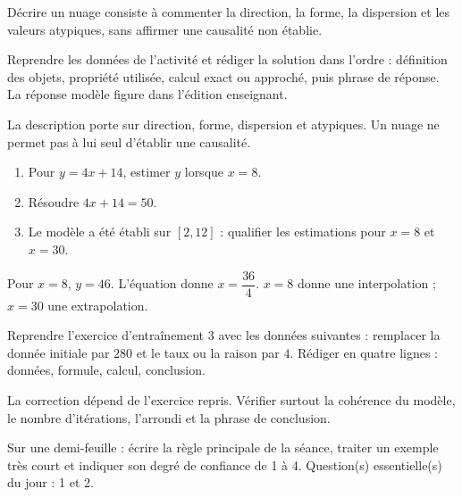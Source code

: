 \begin{summary}Décrire un nuage consiste à commenter la direction, la forme, la dispersion et les valeurs atypiques, sans affirmer une causalité non établie.\end{summary}

\begin{example}
Reprendre les données de l'activité et rédiger la solution dans l'ordre : définition des objets, propriété utilisée, calcul exact ou approché, puis phrase de réponse. La réponse modèle figure dans l'édition enseignant.
\end{example}
\begin{solution}La description porte sur direction, forme, dispersion et atypiques. Un nuage ne permet pas à lui seul d'établir une causalité.\end{solution}

\begin{exercise}[essentiel]
\begin{enumerate}\item Pour $y=4x+14$, estimer $y$ lorsque $x=8$.\item Résoudre $4x+14=50$.\item Le modèle a été établi sur $[2,12]$ : qualifier les estimations pour $x=8$ et $x=30$.\end{enumerate}
\end{exercise}
\begin{solution}Pour $x=8$, $y=46$. L'équation donne $x=\dfrac{36}{4}$. $x=8$ donne une interpolation ; $x=30$ une extrapolation.\end{solution}


\begin{homework}Reprendre l'exercice d'entraînement 3 avec les données suivantes : remplacer la donnée initiale par $280$ et le taux ou la raison par $4$. Rédiger en quatre lignes : données, formule, calcul, conclusion.\end{homework}
\begin{solution}La correction dépend de l'exercice repris. Vérifier surtout la cohérence du modèle, le nombre d'itérations, l'arrondi et la phrase de conclusion.\end{solution}

\begin{exitticket}[3 minutes]Sur une demi-feuille : écrire la règle principale de la séance, traiter un exemple très court et indiquer son degré de confiance de 1 à 4. Question(s) essentielle(s) du jour : 1 et 2.\end{exitticket}

